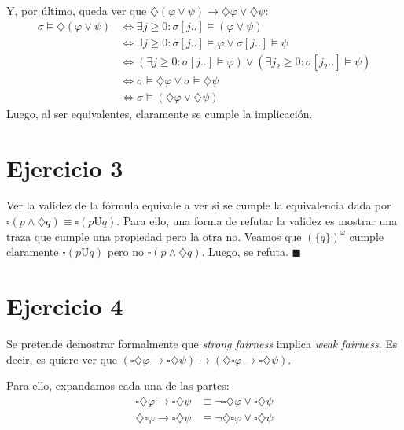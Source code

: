 \documentclass{article}
\begin{document}
Y, por último, queda ver que $\diamondsuit(\varphi \lor \psi) \to \diamondsuit\varphi \lor \diamondsuit\psi$:
\begin{equation*}
	\begin{aligned}
		\sigma \vDash \diamondsuit(\varphi \lor \psi) & \iff \exists j \geq 0 : \sigma[j..] \vDash (\varphi \lor \psi)                                             \\
		                                              & \iff \exists j \geq 0 : \sigma[j..] \vDash \varphi \lor \sigma[j..] \vDash \psi                            \\
		                                              & \iff (\exists j \geq 0 : \sigma[j..] \vDash \varphi) \lor (\exists j_2 \geq 0 : \sigma[j_2..] \vDash \psi) \\
		                                              & \iff \sigma \vDash \diamondsuit\varphi \lor \sigma \vDash \diamondsuit\psi                                 \\
		                                              & \iff \sigma \vDash (\diamondsuit\varphi \lor \diamondsuit\psi)
	\end{aligned}
\end{equation*}
Luego, al ser equivalentes, claramente se cumple la implicación.

\section*{Ejercicio 3}
Ver la validez de la fórmula equivale a ver si se cumple la equivalencia dada por $\square(p \land \diamondsuit q) \equiv \square(p \text{U} q)$.
Para ello, una forma de refutar la validez es mostrar una traza que cumple una propiedad pero la otra no.
Veamos que $(\{q\})^\omega$ cumple claramente $\square(p \text{U} q)$ pero no $\square(p \land \diamondsuit q)$.
Luego, se refuta. $\blacksquare$

\section*{Ejercicio 4}
Se pretende demostrar formalmente que \textit{strong fairness} implica \textit{weak fairness}.
Es decir, es quiere ver que $(\square\diamondsuit\varphi \to \square\diamondsuit \psi) \to (\diamondsuit\square\varphi \to \square\diamondsuit\psi)$.

Para ello, expandamos cada una de las partes:
\begin{equation*}
	\begin{aligned}
		\square\diamondsuit\varphi \to \square\diamondsuit\psi & \equiv \neg\square\diamondsuit\varphi \lor \square\diamondsuit\psi \\
		\diamondsuit\square\varphi \to \square\diamondsuit\psi & \equiv \neg\diamondsuit\square\varphi \lor \square\diamondsuit\psi
	\end{aligned}
\end{equation*}
\end{document}
